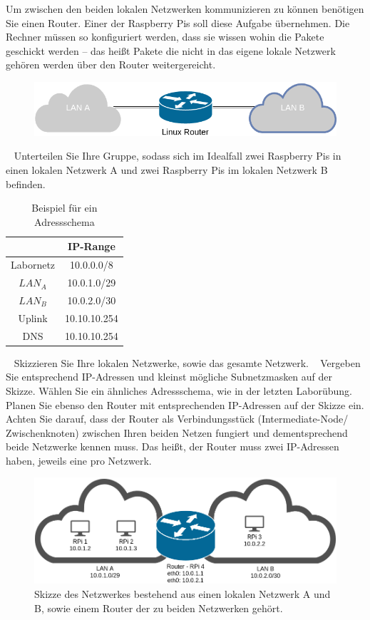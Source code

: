 \documentclass[paper=a4,fontsize=11pt]{scrartcl}%
\numberwithin{equation}{section}
\begin{document}
\begin{enumerate}
	Um zwischen den beiden lokalen Netzwerken kommunizieren zu können benötigen Sie einen Router. Einer der Raspberry Pis soll diese Aufgabe übernehmen. Die Rechner müssen so konfiguriert werden, dass sie wissen wohin die Pakete geschickt werden -- das heißt Pakete die nicht in das eigene lokale Netzwerk gehören werden über den Router weitergereicht.
	\begin{figure}[H]
	\centering
	\includegraphics[scale=0.35]{lan}
	\end{figure}
	\begin{tasks}
		\task~ Unterteilen Sie Ihre Gruppe, sodass sich im Idealfall zwei Raspberry Pis in einen lokalen Netzwerk A und zwei Raspberry Pis im lokalen Netzwerk B befinden.
		\begin{table}[H]
\caption{Beispiel für ein Adressschema}
\label{adress_scheme}
\centering
\begin{tabular}{|c|c|}\hline
 & \textbf{IP-Range} \\ \hline
 Labornetz & 10.0.0.0/8 \\ \hline
 $LAN_A$ & 10.0.1.0/29 \\ \hline
 $LAN_B$ & 10.0.2.0/30 \\ \hline
 Uplink & 10.10.10.254 \\ \hline
 DNS & 10.10.10.254 \\ \hline
\end{tabular}
\end{table}
		\task~ Skizzieren Sie Ihre lokalen Netzwerke, sowie das gesamte Netzwerk.
		\task~ Vergeben Sie entsprechend IP-Adressen und kleinst mögliche Subnetzmasken auf der Skizze. Wählen Sie ein ähnliches Adressschema, wie in der letzten Laborübung.
		\task~ Planen Sie ebenso den Router mit entsprechenden IP-Adressen auf der Skizze ein. Achten Sie darauf, dass der Router als Verbindungsstück (Intermediate-Node/ Zwischenknoten) zwischen Ihren beiden Netzen fungiert und dementsprechend beide Netzwerke kennen muss. Das heißt, der Router muss zwei IP-Adressen haben, jeweils eine pro Netzwerk.
	\end{tasks}
	\begin{figure}[H]
			\centering
			\includegraphics[scale=0.4]{example_lan}
			\caption{Skizze des Netzwerkes bestehend aus einen lokalen Netzwerk A und B, sowie einem Router der zu beiden Netzwerken gehört.}
		\end{figure}
\end{enumerate}
\end{document}
